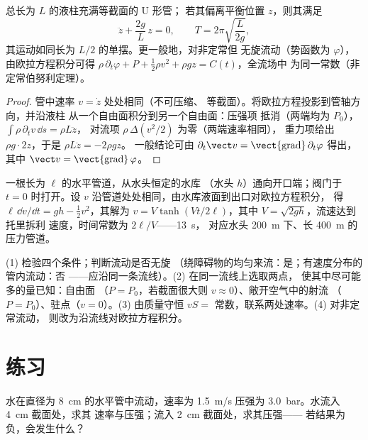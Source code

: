 \begin{proposition}[非定常流动：U 形管]\label{prop:b2:euler-bernoulli:utube}
总长为 $L$ 的液柱充满等截面的 U 形管；
若其偏离平衡位置 $z$，则其满足
\[
\ddot z + \frac{2g}{L}\,z = 0 , \qquad T = 2\pi\sqrt{\frac{L}{2g}} ,
\]
其运动如同长为 $L/2$ 的单摆。更一般地，对非定常但
无旋流动（势函数为 $\varphi$），由欧拉方程积分可得
$\rho\,\partial_t\varphi + P + \tfrac12\rho v^2 + \rho gz = C(t)$，全流场中
为同一常数（非定常伯努利定理）。
\end{proposition}

\begin{proof}
管中速率 $v = \dot z$ 处处相同（不可压缩、
等截面）。将欧拉方程投影到管轴方向，并沿液柱
从一个自由面积分到另一个自由面：压强项
抵消（两端均为 $P_0$），$\int\rho\,\partial_tv\,\dd s = \rho L\ddot z$，
对流项 $\rho\,\Delta(v^2/2)$ 为零（两端速率相同），
重力项给出 $\rho g\cdot2z$，于是 $\rho L\ddot z = -2\rho gz$。
一般结论可由 $\partial_t\vect v = \operatorname{\vect{grad}}
\partial_t\varphi$ 得出，其中 $\vect v = \operatorname{\vect{grad}}\varphi$。
\end{proof}

\begin{example}[管道启动]\label{ex:b2:euler-bernoulli:start}
一根长为 $\ell$ 的水平管道，从水头恒定的水库
（水头 $h$）通向开口端；阀门于 $t = 0$ 时打开。设 $v$
沿管道处处相同，由水库液面到出口对欧拉方程积分，
得 $\ell\,\dd v/\dd t = gh - \tfrac12v^2$，其解为
$v = V\tanh(Vt/2\ell)$，其中 $V = \sqrt{2gh}$，流速达到托里拆利
速度，时间常数为 $2\ell/V$——\qty{13}{s}，
对应水头 \qty{200}{m} 下、长 \qty{400}{m} 的压力管道。
\end{example}

\begin{method}[使用伯努利定理]\label{met:b2:euler-bernoulli:method}
(1) 检验四个条件；判断流动是否无旋
（绕障碍物的均匀来流：是；有速度分布的管内流动：否
——应沿同一条流线）。(2) 在同一流线上选取两点，
使其中尽可能多的量已知：自由面
（$P = P_0$，若截面很大则 $v \approx 0$）、敞开空气中的射流
（$P = P_0$）、驻点（$v = 0$）。(3) 由质量守恒
$vS = $ 常数，联系两处速率。(4) 对非定常流动，
则改为沿流线对欧拉方程积分。
\end{method}

\section{练习}

\begin{exercise}[$\star$]\label{exo:b2:euler-bernoulli:1}
水在直径为 \qty{8}{cm} 的水平管中流动，速率为 \qty{1.5}{m/s}
压强为 \qty{3.0}{bar}。水流入 \qty{4}{cm} 截面处，求其
速率与压强；流入 \qty{2}{cm} 截面处，求其压强——
若结果为负，会发生什么？
\end{exercise}

